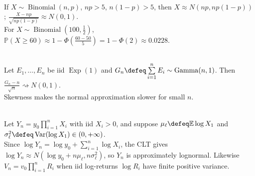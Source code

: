 \begin{example} \label{ex:normal-approximation-binomial-fair-coin} \\
If $X\sim\operatorname{Binomial}(n,p)$, $np>5$, $n(1-p)>5$, then $X\approx N(np,np(1-p))$; $\frac{X-np}{\sqrt{np(1-p)}}\approx N(0,1)$.\\
For $X\sim\operatorname{Binomial}(100,\frac{1}{2})$, $\mathbb{P}(X\geq60)\approx1-\Phi(\frac{60-50}{5})=1-\Phi(2)\approx0.0228$.
\end{example}

\begin{example} \label{ex:gamma-skewness-clt-approximation} \\
Let $E_1,\ldots,E_n$ be iid $\operatorname{Exp}(1)$ and $G_n\defeq\sum\limits_{i=1}^{n}E_i\sim\operatorname{Gamma}(n,1)$. Then $\frac{G_n-n}{\sqrt{n}}\rightsquigarrow N(0,1)$.\\
Skewness makes the normal approximation slower for small $n$.
\end{example}

\begin{example} \label{ex:products-and-lognormal-clt} \\
Let $Y_n=y_0\prod\limits_{i=1}^{n}X_i$ with iid $X_i>0$, and suppose $\mu_\ell\defeq\mathbb{E}\log X_1$ and $\sigma_\ell^2\defeq\operatorname{Var}(\log X_1)\in(0,+\infty)$.\\
Since $\log Y_n=\log y_0+\sum\limits_{i=1}^{n}\log X_i$, the CLT gives $\log Y_n\approx N(\log y_0+n\mu_\ell,n\sigma_\ell^2)$, so $Y_n$ is approximately lognormal. Likewise $V_n=v_0\prod\limits_{i=1}^{n}R_i$ when iid log-returns $\log R_i$ have finite positive variance.
\end{example}

